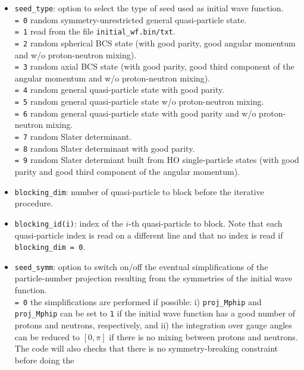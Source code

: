 \documentclass[a4paper,11pt]{article}
\newcommand{\ttt}[1]{\texttt{#1}}
\begin{document}
\begin{itemize}
\item \ttt{seed\_type}: option to select the type of seed used as initial wave function. \\[0.05cm]
 \ttt{= 0\:} random symmetry-unrestricted general quasi-particle state. \\[0.05cm]
 \ttt{= 1\:} read from the file \ttt{initial\_wf.bin/txt}. \\[0.05cm]
 \ttt{= 2\:} random spherical BCS state (with good parity, good angular momentum and w/o proton-neutron mixing). \\[0.05cm]
 \ttt{= 3\:} random axial BCS state (with good parity, good third component of the angular momentum and w/o proton-neutron mixing). \\[0.05cm]
 \ttt{= 4\:} random general quasi-particle state with good parity. \\[0.05cm]
 \ttt{= 5\:} random general quasi-particle state w/o proton-neutron mixing. \\[0.05cm]
 \ttt{= 6\:} random general quasi-particle state with good parity and w/o proton-neutron mixing. \\[0.05cm]
 \ttt{= 7\:} random Slater determinant. \\[0.05cm]
 \ttt{= 8\:} random Slater determinant with good parity. \\[0.05cm]
 \ttt{= 9\:} random Slater determiant built from HO single-particle states (with good parity and good third component of the angular momentum).
\item \ttt{blocking\_dim}: number of quasi-particle to block before the iterative procedure.
\item \ttt{blocking\_id(i)}: index of the $i$-th quasi-particle to block. Note that each quasi-particle index is read on a different line and
 that no index is read if \ttt{blocking\_dim = 0}.
\item \ttt{seed\_symm}: option to switch on/off the eventual simplifications of the particle-number projection resulting from the symmetries of the 
 initial wave function. \\[0.05cm]
 \ttt{= 0\:} the simplifications are performed if possible: i) \ttt{proj\_Mphip} and \ttt{proj\_Mphip} can be set to \ttt{1} if the initial wave function
 has a good number of protons and neutrons, respectively, and ii) the integration over gauge angles can be reduced to $[0,\pi]$ if there is no
 mixing between protons and neutrons. The code will also checks that there is no symmetry-breaking constraint before doing the 

\end{itemize}
\end{document}

